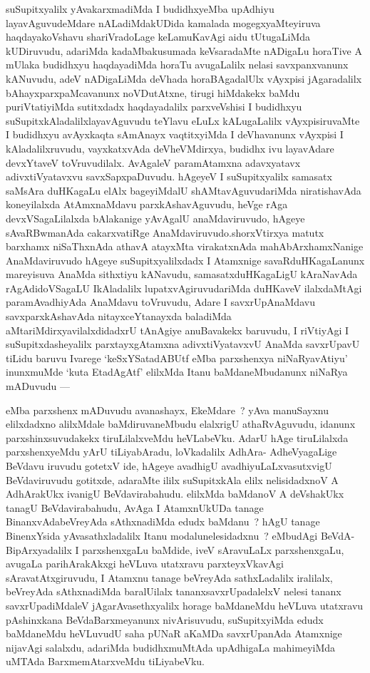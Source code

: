 \begin{artha}
suSupitxyalilx yAvakarxmadiMda I budidhxyeMba upAdhiyu
layavAguvudeMdare nALadiMdakUDida kamalada mogegxyaMteyiruva
haqdayakoVshavu shariVradoLage keLamuKavAgi aidu tUtugaLiMda
kUDiruvudu, adariMda kadaMbakusumada keVsaradaMte nADigaLu horaTive A
mUlaka budidhxyu haqdayadiMda horaTu avugaLalilx nelasi savxpanxvanunx
kANuvudu, adeV nADigaLiMda deVhada horaBAgadalUlx vAyxpisi
jAgaradalilx bAhayxparxpaMcavanunx noVDutAtxne, tirugi hiMdakekx baMdu
puriVtatiyiMda sutitxdadx haqdayadalilx parxveVshisi I budidhxyu
suSupitxkAladalilxlayavAguvudu teYlavu eLuLx kALugaLalilx
vAyxpisiruvaMte I budidhxyu avAyxkaqta sAmAnayx vaqtitxyiMda I
deVhavanunx vAyxpisi I kAladalilxruvudu, vayxkatxvAda deVheVMdirxya,
budidhx ivu layavAdare devxYtaveV toVruvudilalx. AvAgaleV paramAtamxna
adavxyatavx adivxtiVyatavxvu savxSapxpaDuvudu. hAgeyeV I suSupitxyalilx
samasatx saMsAra duHKagaLu elAlx bageyiMdalU shAMtavAguvudariMda
niratishavAda koneyilalxda AtAmxnaMdavu parxkAshavAguvudu, heVge rAga
devxVSagaLilalxda bAlakanige yAvAgalU  anaMdaviruvudo, hAgeye
sAvaRBwmanAda cakarxvatiRge AnaMdaviruvudo.shorxVtirxya  matutx
barxhamx niSaThxnAda athavA atayxMta virakatxnAda 
mahAbArxhamxNanige AnaMdaviruvudo hAgeye suSupitxyalilxdadx I
Atamxnige savaRduHKagaLanunx mareyisuva AnaMda sithxtiyu kANavudu,
samasatxduHKagaLigU kAraNavAda rAgAdidoVSagaLU IkAladalilx
lupatxvAgiruvudariMda duHKaveV ilalxdaMtAgi paramAvadhiyAda AnaMdavu
toVruvudu, Adare I savxrUpAnaMdavu savxparxkAshavAda nitayxceYtanayxda
baladiMda aMtariMdirxyavilalxdidadxrU tAnAgiye anuBavakekx baruvudu, I
riVtiyAgi I suSupitxdasheyalilx parxtayxgAtamxna adivxtiVyatavxvU AnaMda
savxrUpavU tiLidu baruvu Ivarege `keSxYSatadABUtf eMba parxshenxya
niNaRyavAtiyu' inunxmuMde `kuta EtadAgAtf' elilxMda Itanu
baMdaneMbudanunx niNaRya mADuvudu  {\rm ---} 
\end{artha}


\begin{artha}
eMba parxshenx mADuvudu avanashayx, EkeMdare~? yAva manuSayxnu
elilxdadxno alilxMdale baMdiruvaneMbudu elalxrigU athaRvAguvudu,
idanunx parxshinxsuvudakekx tiruLilalxveMdu heVLabeVku. AdarU hAge
tiruLilalxda parxshenxyeMdu yArU tiLiyabAradu, loVkadalilx AdhAra-
AdheVyagaLige BeVdavu iruvudu gotetxV ide, hAgeye avadhigU
avadhiyuLaLxvasutxvigU BeVdaviruvudu gotitxde, adaraMte ililx suSupitxkAla
elilx nelisidadxnoV A AdhArakUkx ivanigU BeVdavirabahudu. elilxMda
baMdanoV A deVshakUkx tanagU BeVdavirabahudu, AvAga  I AtamxnUkUDa
tanage BinanxvAdabeVreyAda sAthxnadiMda edudx baMdanu~? hAgU tanage
BinenxYsida yAvasathxladalilx Itanu modalunelesidadxnu~? eMbudAgi BeVdA-BipArxyadalilx I parxshenxgaLu baMdide, iveV sAravuLaLx
parxshenxgaLu, avugaLa parihArakAkxgi heVLuva utatxravu
parxteyxVkavAgi sAravatAtxgiruvudu, I Atamxnu tanage beVreyAda
sathxLadalilx iralilalx, beVreyAda sAthxnadiMda baralUilalx
tananxsavxrUpadalelxV nelesi tananx savxrUpadiMdaleV
jAgarAvasethxyalilx horage baMdaneMdu heVLuva utatxravu pAshinxkana
BeVdaBarxmeyanunx nivArisuvudu, suSupitxyiMda edudx baMdaneMdu
heVLuvudU saha pUNaR aKaMDa savxrUpanAda Atamxnige nijavAgi salalxdu,
adariMda budidhxmuMtAda upAdhigaLa mahimeyiMda uMTAda
BarxmemAtarxveMdu tiLiyabeVku.
\end{artha}

